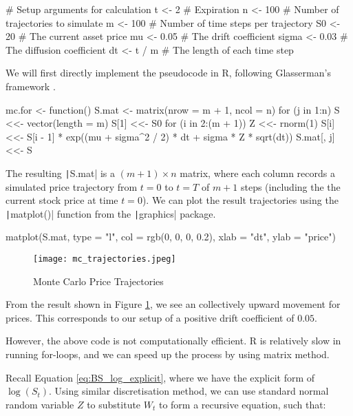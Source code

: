 \begin{Rminted}
# Setup arguments for calculation
t <- 2 # Expiration
n <- 100 # Number of trajectories to simulate
m <- 100 # Number of time steps per trajectory
S0 <- 20 # The current asset price
mu <- 0.05 # The drift coefficient
sigma <- 0.03 # The diffusion coefficient
dt <- t / m # The length of each time step
\end{Rminted}

We will first directly implement the pseudocode in R, following Glasserman's framework \cite{Glasserman2003}.

\begin{Rminted}
mc.for <- function() {
    S.mat <- matrix(nrow = m + 1, ncol = n)
    for (j in 1:n) {
        S <<- vector(length = m)
        S[1] <<- S0
        for (i in 2:(m + 1)) {
            Z <<- rnorm(1)
            S[i] <<- S[i - 1] * exp((mu + sigma^2 / 2) * dt + sigma * Z * sqrt(dt))
        }
        S.mat[, j] <<- S
    }
}
\end{Rminted}

The resulting \texttt|S.mat| is a $(m + 1) \times n$ matrix, where each column records a simulated price trajectory from $t=0$ to $t=T$ of $m+1$ steps (including the the current stock price at time $t=0$). We can plot the result trajectories using the \texttt|matplot()| function from the \texttt|graphics| package.

\begin{Rminted}
matplot(S.mat, type = "l", col = rgb(0, 0, 0, 0.2),
        xlab = "dt", ylab = "price")
\end{Rminted}

\begin{figure}[H]
	\centering
	\texttt{[image: mc\_trajectories.jpeg]}
	\caption{Monte Carlo Price Trajectories} \label{img:mc_trajectories}
\end{figure}

From the result shown in Figure \ref{img:mc_trajectories}, we see an collectively upward movement for prices. This corresponds to our setup of a positive drift coefficient of $0.05$.

However, the above code is not computationally efficient. R is relatively slow in running for-loops, and we can speed up the process by using matrix method.

Recall Equation \ref{eq:BS_log_explicit}, where we have the explicit form of $\log(S_t)$. Using similar discretisation method, we can use standard normal random variable $Z$ to substitute $W_t$ to form a recursive equation, such that:


